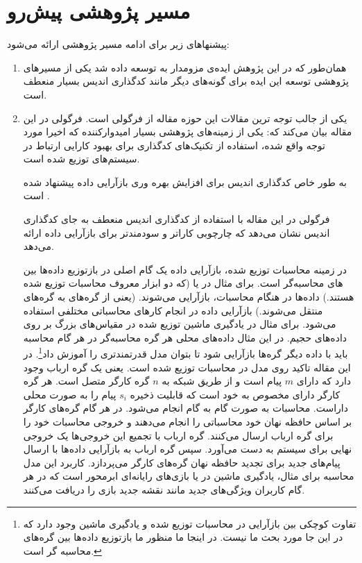 \section{مسیر پژوهشی پیش‌رو}
پیشنهاهای زیر برای ادامه مسیر پژوهشی ارائه می‌شود:
\begin{enumerate}
	\item 
	همان‌طور که در این پژوهش ایده‌ی مزومدار به 
	\picod
	توسعه داده شد یکی از مسیرهای پژوهشی توسعه این ایده برای گونه‌های دیگر مانند کدگذاری اندیس بسیار منعطف است.
	\item 
	یکی از جالب توجه ترین مقالات این حوزه مقاله
	\cite{datashuf}
	از فرگولی است. فرگولی در این مقاله بیان می‌کند که: یکی از زمینه‌های پژوهشی بسیار امیدوارکننده که اخیرا مورد توجه واقع شده، استفاده از تکنیک‌های کدگذاری برای بهبود کارایی ارتباط در سیستم‌های توزیع شده است.
	\cite{Li2015CodedM, 7841903, 8002642, 8051074}
	
	به طور خاص کدگذاری اندیس برای افزایش بهره وری بازآرایی داده پیشنهاد شده است
	\cite{8002642, 8051074}. 

فرگولی در این مقاله با استفاده از کدگذاری اندیس منعطف به جای کدگذاری اندیس نشان می‌دهد که 
\picod
چارچوبی کاراتر و سودمندتر برای بازآرایی داده ارائه می‌دهد.

در زمینه محاسبات توزیع شده، بازآرایی داده یک گام اصلی در بازتوزیع داده‌ها بین 
های محاسبه‌گر است. برای مثال در
یا
(که دو ابزار معروف محاسبات توزیع شده هستند.) داده‌ها در هنگام محاسبات، بازآرایی می‌شوند. (یعنی از گره‌های 
 به گره‌های 
 منتقل می‌شوند.) بازآرایی داده در انجام کارهای محاسباتی مختلفی استفاده می‌شود. برای مثال در یادگیری ماشین توزیع شده در مقیاس‌های بزرگ بر روی داده‌های حجیم. در این مثال داده‌های محلی هر گره محاسبه‌گر در هر گام محاسبه باید با داده دیگر گره‌ها بازآرایی شود تا بتوان مدل قدرتمندتری را آموزش
 داد\footnote{تفاوت کوچکی بین بازآرایی در محاسبات توزیع شده و یادگیری ماشین وجود دارد که در این جا مورد بحث ما نیست. در اینجا ما منظور ما بازتوزیع داده‌ها بین گره‌های محاسبه گر است.}.
 در این مقاله تاکید روی مدل
 در محاسبات توزیع شده است. یعنی یک گره ارباب وجود دارد که دارای
 $m$
 پیام است و از طریق شبکه به
 $n$
 گره کارگر متصل است. هر گره کارگر دارای
 مخصوص به خود است که قابلیت ذخیره
 $s_i$
پیام را به صورت محلی داراست. محاسبات به صورت گام به گام انجام می‌شود. در هر گام گره‌های کارگر بر اساس حافظه نهان خود محاسباتی را انجام می‌دهند و خروجی محاسبات خود را برای گره ارباب ارسال می‌کنند. گره ارباب با تجمیع این خروجی‌ها یک خروجی نهایی برای سیستم به دست می‌آورد. سپس گره ارباب به بازآرایی داده‌ها با ارسال پیام‌های جدید برای تجدید حافظه نهان گره‌های کارگر می‌پردازد. کاربرد این مدل محاسبه برای مثال، یادگیری ماشین در 
یا بازی‌های رایانه‌ای ابرمحور است که در هر گام کاربران ویژگی‌های جدید مانند نقشه جدید بازی را دریافت می‌کنند.


\end{enumerate}
